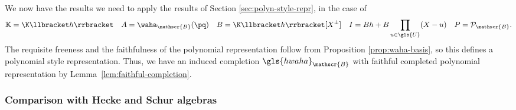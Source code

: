 We now have the results we need to apply the results of Section
\ref{sec:polyn-style-repr}, in the case of
\begin{equation}
\mathbb{K}=\K\llbracket h\rrbracket \quad A=\waha_{\mathscr{B}}(\pq)\quad
 B=\K\llbracket h\rrbracket [X^{\pm}]\quad I=Bh+B \prod_{u\in \gls{U}}(X-u)\quad P=\mathcal{P}_{\mathscr{B}}.\label{eq:wHecke-PR}
\end{equation}
The requisite freeness and the faithfulness of the polynomial
representation follow from Proposition
\ref{prop:waha-basis}, so this defines a polynomial style
representation. Thus, we have an induced completion
$\gls{hwaha}_{\mathscr{B}}$ with faithful completed polynomial
representation by Lemma~\ref{lem:faithful-completion}.


\subsubsection{Comparison with Hecke and Schur algebras}
\label{sec:comp-with-hecke}

